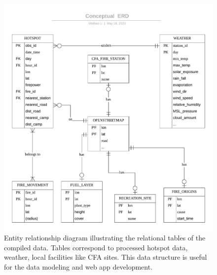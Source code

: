 \documentclass[11pt,a4paper,]{article}
\begin{document}
\begin{figure}
\centering
\includegraphics{figures/Shiny_app_data_Conceptual_ERD.jpeg}
\caption{Entity relationship diagram illustrating the relational tables of the compiled data. Tables correspond to processed hotspot data, weather, local facilities like CFA sites. This data structure is useful for the data modeling and web app development. \label{fig:ERD}}
\end{figure}
\end{document}
